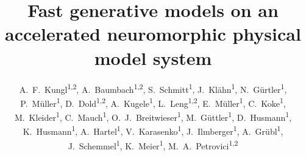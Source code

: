 \title{\LARGE Fast generative models on an accelerated\linebreak{} neuromorphic physical model system} %

\author{\normalsize A.~F.~Kungl\textsuperscript{1,2}, A.~Baumbach\textsuperscript{1,2}, S.~Schmitt\textsuperscript{1}, J.~Kl\"ahn\textsuperscript{1}, N.~G\"urtler\textsuperscript{1}, P.~M\"uller\textsuperscript{1}, D.~Dold\textsuperscript{1,2}, A.~Kugele\textsuperscript{1}, L.~Leng\textsuperscript{1,2}, E.~M\"uller\textsuperscript{1}, C.~Koke\textsuperscript{1}, M.~Kleider\textsuperscript{1}, C.~Mauch\textsuperscript{1}, O.~J.~Breitwieser\textsuperscript{1}, M.~G\"uttler\textsuperscript{1}, D.~Husmann\textsuperscript{1}, K.~Husmann\textsuperscript{1}, A.~Hartel\textsuperscript{1}, V.~Karasenko\textsuperscript{1},  J.~Ilmberger\textsuperscript{1}, A.~Gr\"ubl\textsuperscript{1},  J.~Schemmel\textsuperscript{1}, K.~Meier\textsuperscript{1}, M.~A.~Petrovici\textsuperscript{1,2} } %



\newcommand{\leftfoot}{\url{http://www.kip.uni-heidelberg.de/vision/publications/}} %

\newcommand{\rightfoot}{fkungl@kip.uni-heidelberg.de} %

